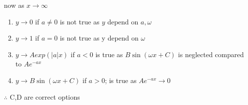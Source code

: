 \documentclass[journal,12pt,twocolumn]{IEEEtran}
\theoremstyle{remark}
\begin{document}
 now as $x\to \infty$
 \begin{enumerate}
     \item $y \to 0$ if $a \neq 0$ is not true as $y$ depend on $a,\omega$
     \item $y \to 1 $ if $ a=0$ is not true as y depend on $\omega$
     \item $y \to Aexp(|a|x)$ if $a < 0$ is true as $ B\sin(\omega x+C)$ is neglected compared to $A e^{-ax}$
     \item $y \to B \sin(\omega x+C)$ if $a>0$; is true as $A e^{-ax} \to 0$ 
     
 \end{enumerate}
  $\therefore$ C,D are correct options
 
 
\end{document}
